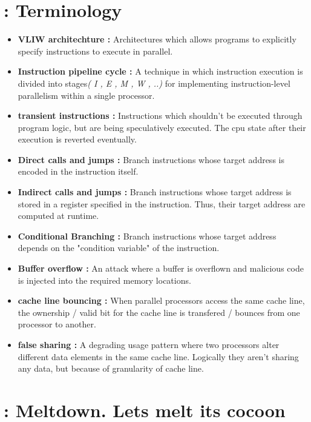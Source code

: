 \documentclass[12pt]{article}
\begin{document}
\newpage


\newpage
\begin{appendices}	
	\section{: Terminology}
	\begin{itemize}
		\item \textbf{VLIW architechture : } Architectures which allows programs to explicitly specify instructions to execute in parallel. 
		\item \textbf{Instruction pipeline cycle : }  A technique in which instruction execution is divided into stages\textit{( I , E , M , W , ..)} for implementing instruction-level parallelism within a single processor. 
		\item \textbf{transient instructions : } Instructions which shouldn't be executed through program logic, but are being speculatively executed. The cpu state after their execution is reverted eventually.  
		\item \textbf{Direct calls and jumps : } Branch instructions whose target address is encoded in the instruction itself.
		\item \textbf{Indirect calls and jumps : } Branch instructions whose target address is stored in a register specified in the instruction. Thus, their target address are computed at runtime.
		\item \textbf{Conditional Branching : } Branch instructions whose target address depends on the "condition variable" of the instruction.
		\item \textbf{Buffer overflow : }  An attack where a buffer is overflown and malicious code is injected into the required memory locations.
		\item \textbf{cache line bouncing : } When parallel processors access the same cache line, the ownership / valid bit for the cache line is transfered / bounces from one processor to another.
		\item \textbf{false sharing : }	 A degrading usage pattern where two processors alter different data elements in the same cache line. Logically they aren't sharing any data, but because of granularity of cache line.
	\end{itemize}
	\newpage
	\section{: Meltdown. Lets melt its cocoon}
	

\end{appendices}
\end{document}
